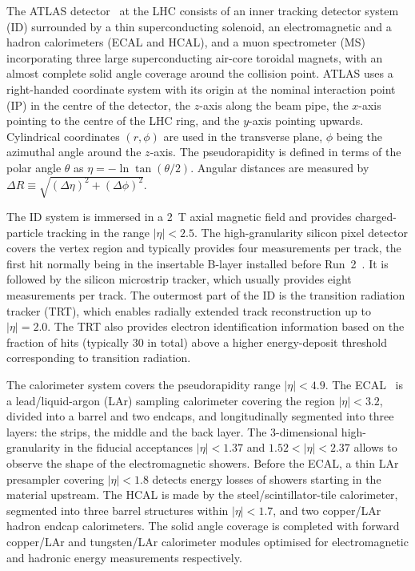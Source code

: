 \newcommand{\AtlasCoordFootnote}{%
ATLAS uses a right-handed coordinate system with its origin at the nominal interaction point (IP)
in the centre of the detector, the \(z\)-axis along the beam pipe, the \(x\)-axis pointing to the centre of the LHC ring,
and the \(y\)-axis pointing upwards.
Cylindrical coordinates \((r,\phi)\) are used in the transverse plane,
\(\phi\) being the azimuthal angle around the \(z\)-axis.
The pseudorapidity is defined in terms of the polar angle \(\theta\) as \(\eta = -\ln \tan(\theta/2)\).
Angular distances are measured by \(\Delta R \equiv \sqrt{(\Delta\eta)^{2} + (\Delta\phi)^{2}}\).}

The ATLAS detector~\cite{PERF-2007-01} at the LHC consists of an inner tracking detector system (ID) surrounded by a thin superconducting solenoid, an electromagnetic and a hadron calorimeters (ECAL and HCAL),
and a muon spectrometer (MS) incorporating three large superconducting air-core toroidal magnets, with 
an almost complete solid angle coverage around the collision point.
\AtlasCoordFootnote

The ID system is immersed in a \SI{2}{\tesla} axial magnetic field 
and provides charged-particle tracking in the range \(|\eta| < 2.5\).
The high-granularity silicon pixel detector covers the vertex region and typically provides four measurements per track, 
the first hit normally being in the insertable B-layer installed before Run~2~\cite{ATLAS-TDR-19,PIX-2018-001}.
It is followed by the silicon microstrip tracker, which usually provides eight measurements per track.
The outermost part of the ID is the transition radiation tracker (TRT),
which enables radially extended track reconstruction up to \(|\eta| = 2.0\). 
The TRT also provides electron identification information 
based on the fraction of hits (typically 30 in total) above a higher energy-deposit threshold corresponding to transition radiation.

The calorimeter system covers the pseudorapidity range \(|\eta| < 4.9\). 
The ECAL~\cite{ATLAS-TDR-02,LARG-2009-01} is a lead/liquid-argon (LAr) sampling calorimeter covering the region \(|\eta|< 3.2\), divided into a barrel and two endcaps, and longitudinally segmented into three layers: the strips, the middle and the back layer. The 3-dimensional high-granularity in the fiducial acceptances $|\eta|<1.37$ and $1.52<|\eta|<2.37$ allows to observe the shape of the electromagnetic showers. Before the ECAL, a thin LAr presampler covering \(|\eta| < 1.8\) detects energy losses of showers starting in the material upstream.
The HCAL is made by the steel/scintillator-tile calorimeter,
segmented into three barrel structures within \(|\eta| < 1.7\), and two copper/LAr hadron endcap calorimeters.
The solid angle coverage is completed with forward copper/LAr and tungsten/LAr calorimeter modules
optimised for electromagnetic and hadronic energy measurements respectively.

